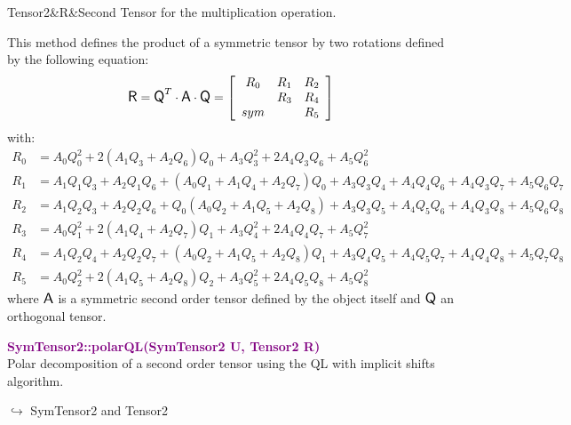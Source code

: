 \begin{tcolorbox}[width=\textwidth,myArgs,tabularx={ll|R}]
Tensor2&R&Second Tensor for the multiplication operation.
\end{tcolorbox}

This method defines the product of a symmetric tensor by two rotations defined by the following equation:
\begin{equation*}
\mbox{\large\ensuremath{\mathsf{R}}} = \mbox{\large\ensuremath{\mathsf{Q}}}^T \cdot \mbox{\large\ensuremath{\mathsf{A}}} \cdot \mbox{\large\ensuremath{\mathsf{Q}}} =\left[\begin{array}{ccc}
R_0 & R_1 & R_2\\
& R_3 & R_4\\
sym &  & R_5
\end{array}\right]
\end{equation*}
with:
\begin{align*}
R_0 &= A_0 Q_0^2 + 2 (A_1 Q_3 + A_2 Q_6) Q_0 + A_3 Q_3^2 + 2 A_4 Q_3 Q_6 + A_5 Q_6^2 \\
R_1 &= A_1 Q_1 Q_3 +A_2 Q_1 Q_6 + (A_0 Q_1 + A_1 Q_4 + A_2 Q_7) Q_0+ A_3 Q_3 Q_4 + A_4 Q_4 Q_6 + A_4 Q_3 Q_7 + A_5 Q_6 Q_7\\
R_2 &= A_1 Q_2 Q_3 + A_2 Q_2 Q_6 + Q_0 (A_0 Q_2 + A_1 Q_5 + A_2 Q_8) + A_3 Q_3 Q_5 + A_4 Q_5 Q_6 + A_4 Q_3 Q_8 + A_5 Q_6 Q_8\\
R_3 &= A_0 Q_1^2 + 2 (A_1 Q_4 + A_2 Q_7)Q_1 + A_3 Q_4^2 + 2 A_4 Q_4 Q_7 + A_5 Q_7^2\\
R_4 &= A_1 Q_2 Q_4 + A_2 Q_2 Q_7 + (A_0 Q_2 + A_1 Q_5 + A_2 Q_8)Q_1 + A_3 Q_4 Q_5 + A_4 Q_5 Q_7 + A_4 Q_4 Q_8 + A_5 Q_7 Q_8\\
R_5 &= A_0 Q_2^2 + 2 (A_1 Q_5 + A_2 Q_8) Q_2 + A_3 Q_5^2 + 2 A_4 Q_5 Q_8 + A_5 Q_8^2
\end{align*}
where $\mbox{\large\ensuremath{\mathsf{A}}}$ is a symmetric second order tensor defined by the object itself and $\mbox{\large\ensuremath{\mathsf{Q}}}$ an orthogonal tensor.

\textcolor{purple}{\textbf{SymTensor2::polarQL(SymTensor2 U, Tensor2 R)}}\label{SymTensor2::polarQL(SymTensor2 U, Tensor2 R)}\\
Polar decomposition of a second order tensor using the QL with implicit shifts algorithm.\vspace*{-0.5em}
\begin{tcolorbox}[grow to left by=-1cm, width=\textwidth-1cm,myArgs,tabularx={l|R}]
$\hookrightarrow$ SymTensor2 and Tensor2
\end{tcolorbox}

